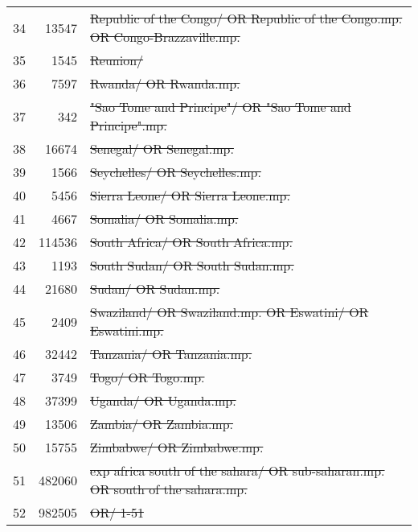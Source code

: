 \begin{tabular}{rrl}
	34 &  \num{13547} & \st{Republic of the Congo/ OR Republic of the Congo.mp. OR Congo-Brazzaville.mp.}         \\
	35 &   \num{1545} & \st{Reunion/}                                                                             \\
	36 &   \num{7597} & \st{Rwanda/ OR Rwanda.mp.}                                                                \\
	37 &    \num{342} & \st{"Sao Tome and Principe"/ OR "Sao Tome and Principe".mp.}                              \\
	38 &  \num{16674} & \st{Senegal/ OR Senegal.mp.}                                                              \\
	39 &   \num{1566} & \st{Seychelles/ OR Seychelles.mp.}                                                        \\
	40 &   \num{5456} & \st{Sierra Leone/ OR Sierra Leone.mp.}                                                    \\
	41 &   \num{4667} & \st{Somalia/ OR Somalia.mp.}                                                              \\
	42 & \num{114536} & \st{South Africa/ OR South Africa.mp.}                                                    \\
	43 &   \num{1193} & \st{South Sudan/ OR South Sudan.mp.}                                                      \\
	44 &  \num{21680} & \st{Sudan/ OR Sudan.mp.}                                                                  \\
	45 &   \num{2409} & \st{Swaziland/ OR Swaziland.mp. OR Eswatini/ OR Eswatini.mp.}                             \\
	46 &  \num{32442} & \st{Tanzania/ OR Tanzania.mp.}                                                            \\
	47 &   \num{3749} & \st{Togo/ OR Togo.mp.}                                                                    \\
	48 &  \num{37399} & \st{Uganda/ OR Uganda.mp.}                                                                \\
	49 &  \num{13506} & \st{Zambia/ OR Zambia.mp.}                                                                \\
	50 &  \num{15755} & \st{Zimbabwe/ OR Zimbabwe.mp.}                                                            \\
	51 & \num{482060} & \st{exp africa south of the sahara/ OR sub-saharan.mp. OR south of the sahara.mp.}        \\
	52 & \num{982505} & \st{OR/ 1-51}                                                                             \\
	\bottomrule
\end{tabular}